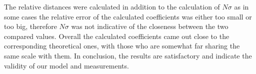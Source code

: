 \documentclass[reprint,amsmath,amssymb,aps, prl,superscriptaddress]{revtex4-2}
\begin{document}
The relative distances were calculated in addition to the calculation of $N\sigma$ as
in some cases the relative error of the calculated coefficients was either too small or too big, therefore $N\sigma$ was not indicative of the closeness between the two compared values. Overall the calculated coefficients came out close to the corresponding theoretical ones, with those who are somewhat far sharing the same scale with them. In conclusion, the results are satisfactory and indicate the validity of our model and measurements.


\end{document}
